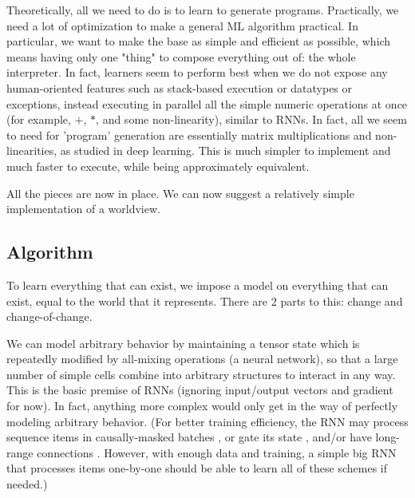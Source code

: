 \documentclass{article}
\begin{document}
\begin{itemize}
Theoretically, all we need to do is to learn to generate programs. Practically, we need a lot of optimization to make a general ML algorithm practical. In particular, we want to make the base as simple and efficient as possible, which means having only one "thing" to compose everything out of: the whole interpreter. In fact, learners seem to perform best when we do not expose any human-oriented features such as stack-based execution or datatypes or exceptions, instead executing in parallel all the simple numeric operations at once (for example, $+$, $*$, and some non-linearity), similar to RNNs. In fact, all we seem to need for 'program' generation are essentially matrix multiplications and non-linearities, as studied in deep learning. This is much simpler to implement and much faster to execute, while being approximately equivalent.
\end{itemize}

All the pieces are now in place. We can now suggest a relatively simple implementation of a worldview.

\subsection{Algorithm\label{Algorithm}}

To learn everything that can exist, we impose a model on everything that can exist, equal to the world that it represents. There are 2 parts to this: change and change-of-change.

We can model arbitrary behavior by maintaining a tensor state which is repeatedly modified by all-mixing operations (a neural network), so that a large number of simple cells combine into arbitrary structures to interact in any way. This is the basic premise of RNNs (ignoring input/output vectors and gradient for now). In fact, anything more complex would only get in the way of perfectly modeling arbitrary behavior. (For better training efficiency, the RNN may process sequence items in causally-masked batches \cite{NEURIPS2020_1457c0d6}, or gate its state \cite{hochreiter1997lstm} \cite{cho2014learning}, and/or have long-range connections \cite{dieng2017topicrnn}. However, with enough data and training, a simple big RNN that processes items one-by-one should be able to learn all of these schemes if needed.)
\end{document}
